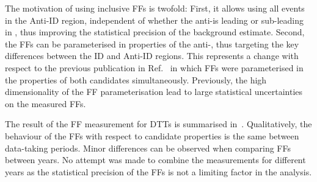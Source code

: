 {  %


  The motivation of using inclusive FFs is twofold: First, it allows using all
  events in the Anti-ID region, independent of whether the anti-\tauhadvis is
  leading or sub-leading in \pT, thus improving the statistical precision of the
  background estimate. Second, the FFs can be parameterised in properties of the
  anti-\tauhadvis, thus targeting the key differences between the ID and
  Anti-ID regions. This represents a change with respect to the previous
  publication in Ref.~\cite{HIGG-2016-16-witherratum} in which FFs were
  parameterised in the properties of both \tauhadvis candidates
  simultaneously. Previously, the high dimensionality of the FF parameterisation
  lead to large statistical uncertainties on the measured FFs.}


The result of the FF measurement for DTTs is summarised
in~. Qualitatively, the behaviour of the FFs with
respect to \tauhadvis candidate properties is the same between data-taking
periods. Minor differences can be observed when comparing FFs between years. No
attempt was made to combine the measurements for different years as the
statistical precision of the FFs is not a limiting factor in the analysis.

